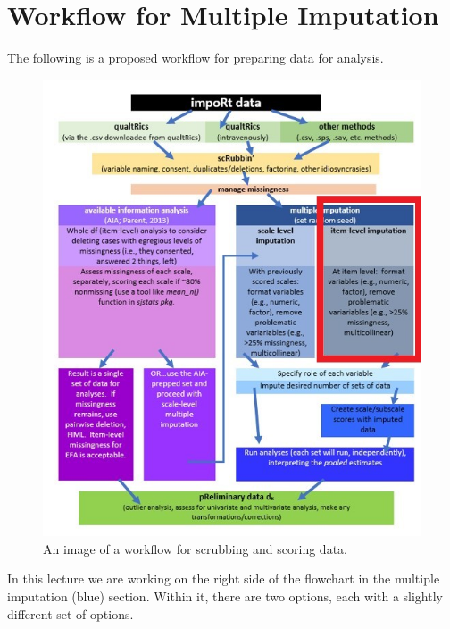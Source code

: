 \documentclass[
]{book}
\begin{document}
\hypertarget{workflow-for-multiple-imputation}{%
\section{Workflow for Multiple Imputation}\label{workflow-for-multiple-imputation}}

The following is a proposed workflow for preparing data for analysis.

\begin{figure}
\centering
\includegraphics{images/Ch05/scrubscore_mimp_itemlvl.jpg}
\caption{An image of a workflow for scrubbing and scoring data.}
\end{figure}

In this lecture we are working on the right side of the flowchart in the multiple imputation (blue) section. Within it, there are two options, each with a slightly different set of options.
\end{document}
